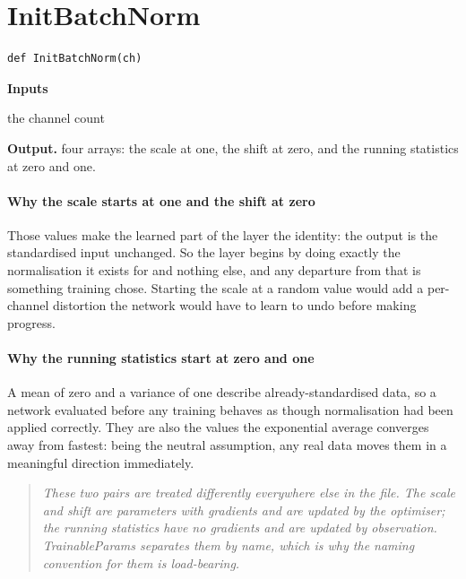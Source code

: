\section{InitBatchNorm}
\begin{lstlisting}[style=sig]
def InitBatchNorm(ch)
\end{lstlisting}

\noindent\textbf{Inputs}
\begin{description}[leftmargin=2.2em,style=nextline,font=\normalfont\ttfamily]\setlength\itemsep{1pt}
  \item[{ch}] \normalfont the channel count
\end{description}

\noindent\textbf{Output.} four arrays: the scale at one, the shift at zero, and the running statistics at zero and one.


\paragraph{Why the scale starts at one and the shift at zero}
Those values make the learned part of the layer the identity: the output is the standardised input unchanged. So the layer begins by doing exactly the normalisation it exists for and nothing else, and any departure from that is something training chose. Starting the scale at a random value would add a per-channel distortion the network would have to learn to undo before making progress.


\paragraph{Why the running statistics start at zero and one}
A mean of zero and a variance of one describe already-standardised data, so a network evaluated before any training behaves as though normalisation had been applied correctly. They are also the values the exponential average converges away from fastest: being the neutral assumption, any real data moves them in a meaningful direction immediately.


\begin{quote}\small\itshape These two pairs are treated differently everywhere else in the file. The scale and shift are parameters with gradients and are updated by the optimiser; the running statistics have no gradients and are updated by observation. TrainableParams separates them by name, which is why the naming convention for them is load-bearing.\end{quote}

